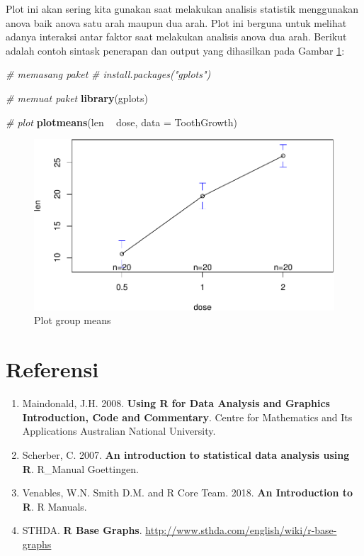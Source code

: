 \documentclass[]{book}
\newenvironment{Shaded}{\begin{snugshade}}{\end{snugshade}}
\newcommand{\KeywordTok}[1]{\textcolor[rgb]{0.13,0.29,0.53}{\textbf{#1}}}
\newcommand{\DataTypeTok}[1]{\textcolor[rgb]{0.13,0.29,0.53}{#1}}
\newcommand{\StringTok}[1]{\textcolor[rgb]{0.31,0.60,0.02}{#1}}
\newcommand{\CommentTok}[1]{\textcolor[rgb]{0.56,0.35,0.01}{\textit{#1}}}
\newcommand{\OperatorTok}[1]{\textcolor[rgb]{0.81,0.36,0.00}{\textbf{#1}}}
\newcommand{\NormalTok}[1]{#1}
\providecommand{\tightlist}{%
  \setlength{\itemsep}{0pt}\setlength{\parskip}{0pt}}
\begin{document}
Plot ini akan sering kita gunakan saat melakukan analisis statistik
menggunakan anova baik anova satu arah maupun dua arah. Plot ini berguna
untuk melihat adanya interaksi antar faktor saat melakukan analisis
anova dua arah. Berikut adalah contoh sintask penerapan dan output yang
dihasilkan pada Gambar \ref{fig:plotmeans}:

\begin{Shaded}
\begin{Highlighting}[]
\CommentTok{# memasang paket}
\CommentTok{# install.packages("gplots")}

\CommentTok{# memuat paket}
\KeywordTok{library}\NormalTok{(gplots)}

\CommentTok{# plot}
\KeywordTok{plotmeans}\NormalTok{(len }\OperatorTok{~}\StringTok{ }\NormalTok{dose, }\DataTypeTok{data =}\NormalTok{ ToothGrowth)}
\end{Highlighting}
\end{Shaded}

\begin{figure}

{\centering \includegraphics[width=0.7\linewidth]{EnvStat_files/figure-latex/plotmeans-1} 

}

\caption{Plot group means}\label{fig:plotmeans}
\end{figure}

\section{Referensi}\label{referensi-3}

\begin{enumerate}
\def\labelenumi{\arabic{enumi}.}
\tightlist
\item
  Maindonald, J.H. 2008. \textbf{Using R for Data Analysis and Graphics
  Introduction, Code and Commentary}. Centre for Mathematics and Its
  Applications Australian National University.
\item
  Scherber, C. 2007. \textbf{An introduction to statistical data
  analysis using R}. R\_Manual Goettingen.
\item
  Venables, W.N. Smith D.M. and R Core Team. 2018. \textbf{An
  Introduction to R}. R Manuals.
\item
  STHDA. \textbf{R Base Graphs}.
  \url{http://www.sthda.com/english/wiki/r-base-graphs}
\end{enumerate}
\end{document}
